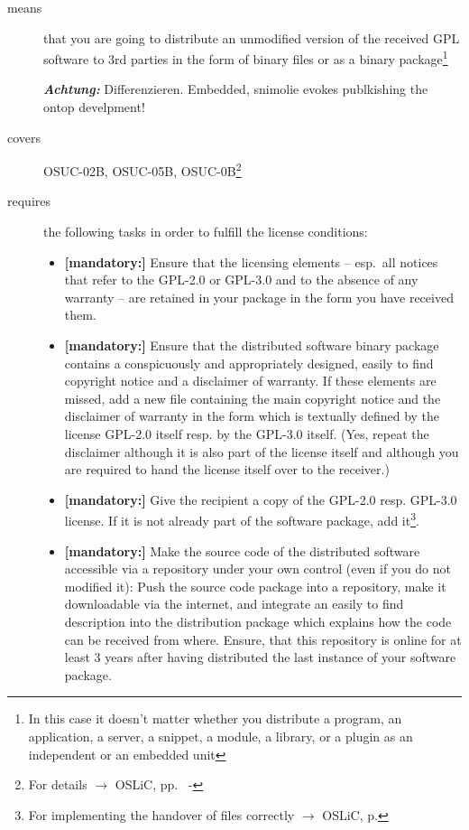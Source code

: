 \begin{description}
\item[means] that you are going to distribute an unmodified version of the
received GPL software to 3rd parties in the form of binary files or as a
bi\-na\-ry package\footnote{In this case it doesn't matter whether you 
distribute a program, an application, a server, a snippet, a module, a library,
or a plugin as an independent or an embedded unit}

\textbf{\emph{Achtung:}} Differenzieren. Embedded, snimolie evokes publkishing the ontop develpment!

\item[covers] OSUC-02B, OSUC-05B, OSUC-0B\footnote{For details $\rightarrow$ OSLiC, pp.\
\pageref{OSUC-02B-DEF} - \pageref{OSUC-07B-DEF}}

\item[requires] the following tasks in order to fulfill the license conditions:
\begin{itemize}
  
  \item \textbf{[mandatory:]} Ensure that the licensing elements -- esp.\ all
  notices that refer to the GPL-2.0 or GPL-3.0 and to the absence of any
  warranty -- are retained in your package in the form you have received them.

  \item \textbf{[mandatory:]} Ensure that the distributed software binary
  package contains a conspicuously and appropriately designed, easily to find
  copyright notice and a disclaimer of warranty. If these elements are missed,
  add a new file containing the main copyright notice and the disclaimer of
  warranty in the form which is textually defined by the license GPL-2.0 itself
  resp. by the GPL-3.0 itself. (Yes, repeat the disclaimer although it is also
  part of the license itself and although you are required to hand the license
  itself over to the receiver.)
  
  \item \textbf{[mandatory:]} Give the recipient a copy of the GPL-2.0 resp.
  GPL-3.0 license. If it is not already part of the software package, add
  it\footnote{For implementing the handover of files correctly $\rightarrow$
  OSLiC, p. \pageref{DistributingFilesHint}}.
  
  \item \textbf{[mandatory:]} Make the source code of the distributed software
  accessible via a repository under your own control (even if you do not
  modified it): Push the source code package into a repository, make it
  downloadable via the internet, and integrate an easily to find description
  into the distribution package which explains how the code can be received from
  where. Ensure, that this repository is online for at least 3 years after
  having distributed the last instance of your software package.
  

\end{itemize}
\end{description}
